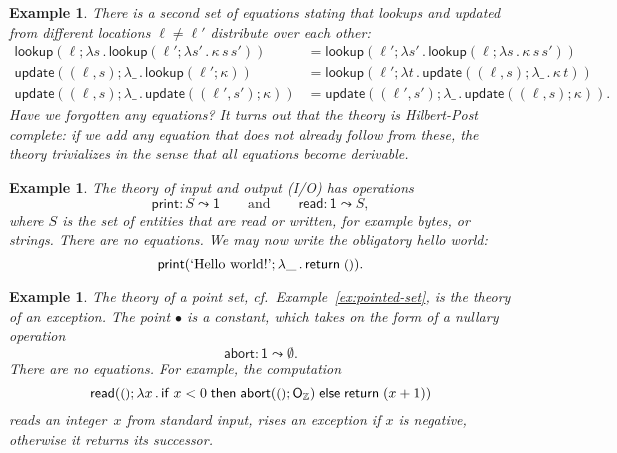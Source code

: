 \documentclass{amsart}
\newcommand{\ZZ}{\mathbb{Z}} %
\newcommand{\lam}[1]{\lambda #1 \,.\,}
\newcommand{\opdecl}[3]{#1 : #2 \leadsto #3} %
\newcommand{\one}{\mathsf{1}} %
\newcommand{\unit}{{\text{\small$()$}}} %
\newcommand{\cond}[3]{\mathsf{if}\;#1\;\mathsf{then}\;#2\;\mathsf{else}\;#3}
\newcommand{\kode}[1]{\mathsf{#1}}
\newcommand{\opcall}[3]{\kode{#1}(#2; #3)}
\newcommand{\return}[1]{\kode{return}\;#1}
\newtheorem{example}[definition]{Example}
\begin{document}
\begin{example}
  There is a second set of equations stating that lookups and updated from
  \emph{different} locations $\ell \neq \ell'$ distribute over each other:
  \begin{align*}
    \opcall{lookup}{\ell}{
       \lam{s} \opcall{lookup}{\ell'}{\lam{s'} \kappa \, s \, s'}
    } &=
    \opcall{lookup}{\ell'}{
       \lam{s'} \opcall{lookup}{\ell}{\lam{s} \kappa \, s \, s'}
    }
    \\
    \opcall{update}{(\ell, s)}{
       \lam{\_} \opcall{lookup}{\ell'}{\kappa}
    } &=
    \opcall{lookup}{\ell'}{
       \lam{t} \opcall{update}{(\ell, s)}{
          \lam{\_} \kappa \, t
       }
    } \\
    \opcall{update}{(\ell, s)}{
       \lam{\_} \opcall{update}{(\ell', s')}{\kappa}
    } &=
    \opcall{update}{(\ell', s')}{
       \lam{\_} \opcall{update}{(\ell, s)}{\kappa}
    }.
  \end{align*}
  Have we forgotten any equations?
  It turns out that the theory is Hilbert-Post complete: if we add any equation
  that does not already follow from these, the theory trivializes in the sense
  that all equations become derivable.
\end{example}

\begin{example}
  \label{ex:theory-io}
  The theory of \emph{input and output} (I/O) has operations
  \begin{equation*}
    \opdecl{\kode{print}}{S}{\one}
    \qquad\text{and}\qquad
    \opdecl{\kode{read}}{\one}{S},
  \end{equation*}
  where $S$ is the set of entities that are read or written, for example bytes,
  or strings. There are no equations. We may now write the obligatory hello world:
  \begin{equation*}
    \opcall{print}{\text{`Hello world!'}}{\lam{\_} \return{\unit}}.
  \end{equation*}
\end{example}

\begin{example}
  \label{ex:theory-exception}
  The theory of a point set, cf.\ Example~\ref{ex:pointed-set}, is the theory of
  an \emph{exception}. The point $\bullet$ is a constant, which takes on the
  form of a nullary operation
  \begin{equation*}
    \opdecl{\kode{abort}}{\one}{\emptyset}.
  \end{equation*}
  There are no equations. For example, the computation
  \begin{equation*}
    \opcall{read}{\unit}{
      \lam{x}{
        \cond{x < 0}{\opcall{abort}{\unit}{\mathsf{O}_\ZZ}}{\return{(x+1)}}
      }
    }
  \end{equation*}
  reads an integer~$x$ from standard input, rises an exception if $x$ is
  negative, otherwise it returns its successor.
\end{example}
\end{document}
